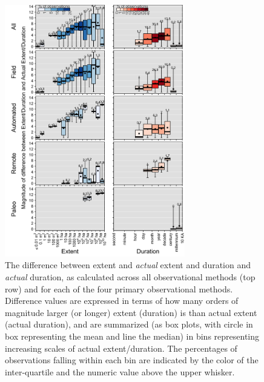 \documentclass[12pt]{article}
\begin{document}
\begin{figure}[!ht]
\centering
\includegraphics[width=0.7\textwidth]{../vignettes/figures/figS3.png}
\vspace{-5 pt}
\caption{The difference between extent and \emph{actual} extent and duration and \emph{actual} duration, as calculated across all observational methods (top row) and for each of the four primary observational methods. Difference values are expressed in terms of how many orders of magnitude larger (or longer) extent (duration) is than actual extent (actual duration), and are summarized (as box plots, with circle in box representing the mean and line the median) in bins representing increasing scales of actual extent/duration.  The percentages of observations falling within each bin are indicated by the color of the inter-quartile and the numeric value above the upper whisker.}
\label{obsdiff}
\end{figure}
\end{document}
